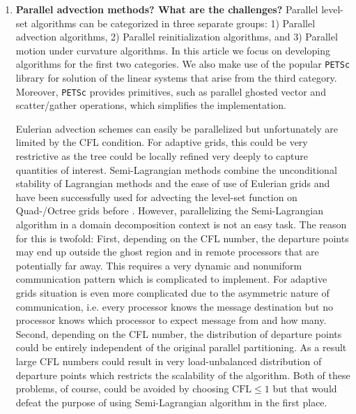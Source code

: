 \begin{enumerate}
\item \textbf{Parallel advection methods? What are the challenges?}
Parallel level-set algorithms can be categorized in three separate groups: 1) Parallel advection algorithms, 2) Parallel reinitialization algorithms, and 3) Parallel motion under curvature algorithms. In this article we focus on developing algorithms for the first two categories. We also make use of the popular \texttt{PETSc}  library for solution of the linear systems that arise from the third category. Moreover, \texttt{PETSc} provides primitives, such as parallel ghosted vector and scatter/gather operations, which simplifies the implementation. 

Eulerian advection schemes can easily be parallelized but unfortunately are limited by the CFL condition. For adaptive grids, this could be very restrictive as the tree could be locally refined very deeply to capture quantities of interest. Semi-Lagrangian methods combine the unconditional stability of Lagrangian methods and the ease of use of Eulerian grids and have been successfully used for advecting the level-set function on Quad-/Octree grids before . However, parallelizing the Semi-Lagrangian algorithm in a domain decomposition context is not an easy task. The reason for this is twofold: First, depending on the CFL number, the departure points may end up outside the ghost region and in remote processors that are potentially far away. This requires a very dynamic and nonuniform communication pattern which is complicated to implement. For adaptive grids situation is even more complicated due to the asymmetric nature of communication, i.e. every processor knows the message destination but no processor knows which processor to expect message from and how many. Second, depending on the CFL number, the distribution of departure points could be entirely independent of the original parallel partitioning. As a result large CFL numbers could result in very load-unbalanced distribution of departure points which restricts the scalability of the algorithm. Both of these problems, of course, could be avoided by choosing $\text{CFL} \le 1$ but that would defeat the purpose of using Semi-Lagrangian algorithm in the first place. 


\end{enumerate}
